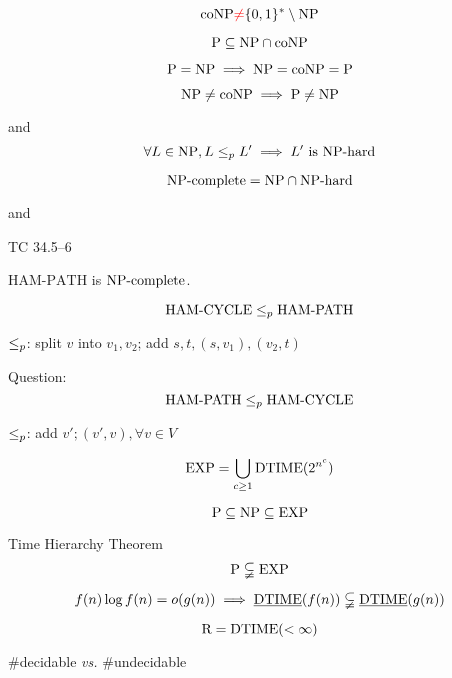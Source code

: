 \begin{frame}{\conp{}}
  \[
	\text{coNP}{} \textcolor{red}{\neq} \{0,1\}^{\ast} \setminus \text{NP}
  \]

  \[
	\text{P} \subseteq \text{NP} \cap \text{coNP}
  \]

  \[
	\text{P} = \text{NP} \implies \text{NP} = \text{coNP} = \text{P}
  \]

  \[
	\text{NP} \neq \text{coNP} \implies \text{P} \neq \text{NP}
  \]
\end{frame}
\begin{frame}{\nph{} and \npc}
  \[
	\forall L \in \text{NP}, L \le_{p} L' \implies L' \text{ is } \text{NP-hard}
  \]

  \[
	\text{NP-complete} = \text{NP} \cap \text{NP-hard}
  \]
\end{frame}
\begin{frame}{\nph{} and \npc}
  \begin{exampleblock}{TC 34.5--6}
	\centerline{$\text{HAM-PATH}$ is $\text{NP-complete}$.}
  \end{exampleblock}

  \[
	\text{HAM-CYCLE} \le_{p} \text{HAM-PATH}
  \]

  \centerline{$\le_{p}$: split $v$ into $v_1, v_2$; add $s, t, (s,v_1), (v_2, t)$}

  \vspace{0.50cm}
  \begin{alertblock}{Question:}
	\[
	  \text{HAM-PATH} \le_{p} \text{HAM-CYCLE}
	\]

	\centerline{$\le_{p}$: add $v'; (v', v), \forall v \in V $}
  \end{alertblock}
\end{frame}
\begin{frame}{\expcls}
  \[
	\text{EXP} = \bigcup_{c \ge 1} \text{DTIME}(2^{n^c})
  \]

  \[
    \text{P} \subseteq \text{NP} \subseteq \text{EXP}
  \]
\end{frame}
\begin{frame}{Time Hierarchy Theorem}
  \[
	\text{P} \subsetneqq \text{EXP}
  \]

  \begin{theorem}
	\[
	  f(n) \log f(n) = o(g(n)) \implies \emph{\text{DTIME}}(f(n)) \subsetneqq \emph{\text{DTIME}}(g(n))
	\]
  \end{theorem}
\end{frame}
\begin{frame}{\rcls}
  \[
	\text{R} = \text{DTIME}(<\infty)
  \]

  \vspace{0.80cm}
  \centerline{\#decidable \emph{vs.} \#undecidable}
\end{frame}
